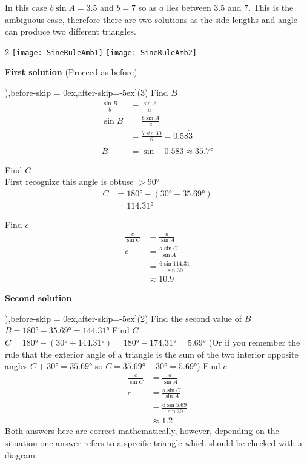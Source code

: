 \solution In this case $b \sin  A =3.5$ and $b =7$ so as $a$ lies between $3.5$ and $7$. This is the ambiguous case, therefore there are two solutions as the side lengths and angle can produce two different triangles.
\begin {multicols}{2}
\texttt{[image: SineRuleAmb1]}\columnbreak
\texttt{[image: SineRuleAmb2]}
\end {multicols}
\textbf{First solution} (Proceed as before) 
\begin{tasks}[counter-format=(tsk[1]),before-skip = {0ex},after-skip={-5ex}](3)
	\task Find $B$
\begin{align*}\frac{\sin  B}{b} &  = \frac{\sin  A}{a} \\
\sin  B &  = \frac{b \sin  A}{a} \\
&  = \frac{7 \sin  30 }{6} =0.58 \dot{3} \\
B &  = \sin ^{ -1} 0.58 \dot{3} \approx \ang{35.7} \end{align*}

\task Find $C$\\
First recognize this angle is obtuse $>\ang{90}$
\begin{align*}C &  = \ang{180}  -(\ang{30}  +\ang{35.69} ) \\
&  = \ang{114.31} \end{align*} 

\task Find $c$
\begin{align*}\frac{c}{\sin  C} &  = \frac{a}{\sin  A} \\
c &  = \frac{a \sin  C}{\sin  A} \\
&  = \frac{6 \sin  114.31 }{\sin  30 } \\
&  \approx   10.9\end{align*}
\end{tasks}
\textbf{Second solution} 
\begin{tasks}[counter-format=(tsk[1]),before-skip = {0ex},after-skip={-5ex}](2)
	\task Find the second value of $B$ \\
$B =\ang{180}  -\ang{35.69}  =\ang{144.31} $
\task Find $C$\\
$C =\ang{180} -(\ang{30}  +\ang{144.31} ) =\ang{180}  -\ang{174.31}  =\ang{5.69} $
\task*[](Or if you remember the rule that the exterior angle of a triangle is the sum of the two interior opposite angles $C +\ang{30}  =\ang{35.69} $ so $C =\ang{35.69}  -\ang{30}  =\ang{5.69} $) 
\task[(3)] Find $c$
\begin{align*}\frac{c}{\sin  C} &  = \frac{a}{\sin  A} \\
c &  = \frac{a \sin  C}{\sin  A} \\
&  = \frac{6 \sin  5.69 }{\sin  30 } \\
&  \approx   1.2\end{align*}
\task[]Both answers here are correct mathematically, however, depending on the situation one answer refers to a specific triangle which should be checked with a diagram.
\end{tasks}

